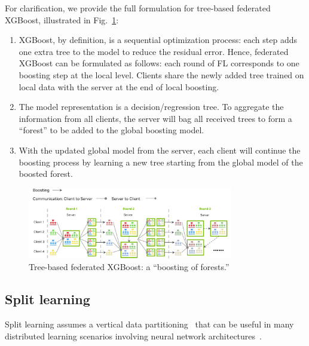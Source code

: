 \documentclass[11pt]{article}
\begin{document}
For clarification, we provide the full formulation for tree-based federated XGBoost, illustrated in Fig.~\ref{fig:tree_xgboost}:
\begin{enumerate}
\item XGBoost, by definition, is a sequential optimization process: each step adds one extra tree to the model to reduce the residual error. Hence, federated XGBoost can be formulated as follows: each round of FL corresponds to one boosting step at the local level. Clients share the newly added tree trained on local data with the server at the end of local boosting.
\item The model representation is a decision/regression tree. To aggregate the information from all clients, the server will bag all received trees to form a ``forest'' to be added to the global boosting model.
\item With the updated global model from the server, each client will continue the boosting process by learning a new tree starting from the global model of the boosted forest.
\end{enumerate}

\begin{figure}[htbp]
    \centering
    \includegraphics[width=0.8\textwidth]{fig/TreeXGBoost.pdf}
    \caption{Tree-based federated XGBoost: a ``boosting of forests.'' \label{fig:tree_xgboost}}
\end{figure}


\subsection{Split learning}
Split learning assumes a vertical data partitioning~\cite{yang2019federated} that can be useful in many distributed learning scenarios involving neural network architectures~\cite{gupta2018distributed}.
\end{document}
